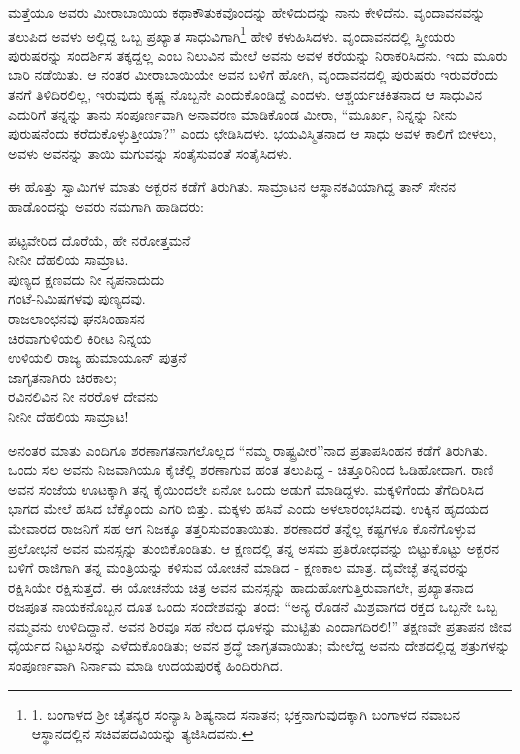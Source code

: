 ಮತ್ತೆಯೂ ಅವರು ಮೀರಾಬಾಯಿಯ ಕಥಾಕೌತುಕವೊಂದನ್ನು ಹೇಳಿದುದನ್ನು ನಾನು ಕೇಳಿದೆನು. ವೃಂದಾವನವನ್ನು ತಲುಪಿದ ಅವಳು ಅಲ್ಲಿದ್ದ ಒಬ್ಬ ಪ್ರಖ್ಯಾತ ಸಾಧುವಿಗಾಗಿ\footnote{1. ಬಂಗಾಳದ ಶ‍್ರೀ ಚೈತನ್ಯರ ಸಂನ್ಯಾಸಿ ಶಿಷ್ಯನಾದ ಸನಾತನ; ಭಕ್ತನಾಗುವುದಕ್ಕಾಗಿ ಬಂಗಾಳದ ನವಾಬನ ಆಸ್ಥಾನದಲ್ಲಿನ ಸಚಿವಪದವಿಯನ್ನು ತ್ಯಜಿಸಿದವನು.} ಹೇಳಿ ಕಳುಹಿಸಿದಳು. ವೃಂದಾವನದಲ್ಲಿ ಸ್ತ್ರೀಯರು ಪುರುಷರನ್ನು ಸಂದರ್ಶಿಸ ತಕ್ಕದ್ದಲ್ಲ ಎಂಬ ನಿಲುವಿನ ಮೇಲೆ ಅವನು ಅವಳ ಕರೆಯನ್ನು ನಿರಾಕರಿಸಿದನು. ಇದು ಮೂರು ಬಾರಿ ನಡೆಯಿತು. ಆ ನಂತರ ಮೀರಾಬಾಯಿಯೇ ಅವನ ಬಳಿಗೆ ಹೋಗಿ, ವೃಂದಾವನದಲ್ಲಿ ಪುರುಷರು ಇರುವರೆಂದು ತನಗೆ ತಿಳಿದಿರಲಿಲ್ಲ, ಇರುವುದು ಕೃಷ್ಣ ನೊಬ್ಬನೇ ಎಂದುಕೊಂಡಿದ್ದೆ ಎಂದಳು. ಆಶ್ಚರ್ಯಚಕಿತನಾದ ಆ ಸಾಧುವಿನ ಎದುರಿಗೆ ತನ್ನನ್ನು ತಾನು ಸಂಪೂರ್ಣವಾಗಿ ಅನಾವರಣ ಮಾಡಿಕೊಂಡ ಮೀರಾ, “ಮೂರ್ಖ, ನಿನ್ನನ್ನು ನೀನು ಪುರುಷನೆಂದು ಕರೆದುಕೊಳ್ಳುತ್ತೀಯಾ?” ಎಂದು ಛೇಡಿಸಿದಳು. ಭಯವಿಸ್ಮಿತನಾದ ಆ ಸಾಧು ಅವಳ ಕಾಲಿಗೆ ಬೀಳಲು, ಅವಳು ಅವನನ್ನು ತಾಯಿ ಮಗುವನ್ನು ಸಂತೈಸುವಂತೆ ಸಂತೈಸಿದಳು.

ಈ ಹೊತ್ತು ಸ್ವಾಮಿಗಳ ಮಾತು ಅಕ್ಬರನ ಕಡೆಗೆ ತಿರುಗಿತು. ಸಾಮ್ರಾಟನ ಆಸ್ಥಾನಕವಿಯಾಗಿದ್ದ ತಾನ್ ಸೇನನ ಹಾಡೊಂದನ್ನು ಅವರು ನಮಗಾಗಿ ಹಾಡಿದರು:

\begin{myquote}
ಪಟ್ಟವೇರಿದ ದೊರೆಯೆ, ಹೇ ನರೋತ್ತಮನೆ\\ನೀನೀ ದೆಹಲಿಯ ಸಾಮ್ರಾಟ.\\ಪುಣ್ಯದ ಕ್ಷಣವದು ನೀ ನೃಪನಾದುದು\\ಗಂಟೆ-ನಿಮಿಷಗಳವು ಪುಣ್ಯದವು.\\ರಾಜಲಾಂಛನವು ಘನಸಿಂಹಾಸನ\\ಚಿರವಾಗುಳಿಯಲಿ ಕಿರೀಟ ನಿನ್ನಯ\\ಉಳಿಯಲಿ ರಾಜ್ಯ ಹುಮಾಯೂನ್ ಪುತ್ರನೆ\\ಜಾಗೃತನಾಗಿರು ಚಿರಕಾಲ;\\ರವಿನಲಿವಿನ ನೀ ನರರೊಳ ದೇವನು\\ನೀನೀ ದೆಹಲಿಯ ಸಾಮ್ರಾಟ!
\end{myquote}

ಅನಂತರ ಮಾತು ಎಂದಿಗೂ ಶರಣಾಗತನಾಗಲೊಲ್ಲದ “ನಮ್ಮ ರಾಷ್ಟ್ರವೀರ”ನಾದ ಪ್ರತಾಪಸಿಂಹನ ಕಡೆಗೆ ತಿರುಗಿತು. ಒಂದು ಸಲ ಅವನು ನಿಜವಾಗಿಯೂ ಕೈಚೆಲ್ಲಿ ಶರಣಾಗುವ ಹಂತ ತಲುಪಿದ್ದ - ಚಿತ್ತೂರಿನಿಂದ ಓಡಿಹೋದಾಗ. ರಾಣಿ ಅವನ ಸಂಜೆಯ ಊಟಕ್ಕಾಗಿ ತನ್ನ ಕೈಯಿಂದಲೇ ಏನೋ ಒಂದು ಅಡುಗೆ ಮಾಡಿದ್ದಳು. ಮಕ್ಕಳಿಗೆಂದು ತೆಗೆದಿರಿಸಿದ ಭಾಗದ ಮೇಲೆ ಹಸಿದ ಬೆಕ್ಕೊಂದು ಎಗರಿ ಬಿತ್ತು. ಮಕ್ಕಳು ಹಸಿವೆ ಎಂದು ಅಳಲಾರಂಭಸಿದವು. ಉಕ್ಕಿನ ಹೃದಯದ ಮೇವಾರದ ರಾಜನಿಗೆ ಸಹ ಆಗ ನಿಜಕ್ಕೂ ತತ್ತರಿಸುವಂತಾಯಿತು. ಶರಣಾದರೆ ತನ್ನೆಲ್ಲ ಕಷ್ಟಗಳೂ ಕೊನೆಗೊಳ್ಳುವ ಪ್ರಲೋಭನೆ ಅವನ ಮನಸ್ಸನ್ನು ತುಂಬಿಕೊಂಡಿತು. ಆ ಕ್ಷಣದಲ್ಲಿ ತನ್ನ ಅಸಮ ಪ್ರತಿರೋಧವನ್ನು ಬಿಟ್ಟುಕೊಟ್ಟು ಅಕ್ಬರನ ಬಳಿಗೆ ರಾಜಿಗಾಗಿ ತನ್ನ ಮಂತ್ರಿಯನ್ನು ಕಳಿಸುವ ಯೋಚನೆ ಮಾಡಿದ - ಕ್ಷಣಕಾಲ ಮಾತ್ರ. ದೈವೇಚ್ಛೆ ತನ್ನವರನ್ನು ರಕ್ಷಿಸಿಯೇ ರಕ್ಷಿಸುತ್ತದೆ. ಈ ಯೋಚನೆಯ ಚಿತ್ರ ಅವನ ಮನಸ್ಸನ್ನು ಹಾದುಹೋಗುತ್ತಿರುವಾಗಲೇ, ಪ್ರಖ್ಯಾತನಾದ ರಜಪೂತ ನಾಯಕನೊಬ್ಬನ ದೂತ ಒಂದು ಸಂದೇಶವನ್ನು ತಂದ: “ಅನ್ಯ ರೊಡನೆ ಮಿಶ್ರವಾಗದ ರಕ್ತದ ಒಬ್ಬನೇ ಒಬ್ಬ ನಮ್ಮವನು ಉಳಿದಿದ್ದಾನೆ. ಅವನ ಶಿರವೂ ಸಹ ನೆಲದ ಧೂಳನ್ನು ಮುಟ್ಟಿತು ಎಂದಾಗದಿರಲಿ!” ತಕ್ಷಣವೇ ಪ್ರತಾಪನ ಜೀವ ಧೈರ್ಯದ ನಿಟ್ಟುಸಿರನ್ನು ಎಳೆದುಕೊಂಡಿತು; ಅವನ ಶ್ರದ್ಧೆ ಜಾಗೃತವಾಯಿತು; ಮೇಲೆದ್ದ ಅವನು ದೇಶದಲ್ಲಿದ್ದ ಶತ್ರುಗಳನ್ನು ಸಂಪೂರ್ಣವಾಗಿ ನಿರ್ನಾಮ ಮಾಡಿ ಉದಯಪುರಕ್ಕೆ ಹಿಂದಿರುಗಿದ.

